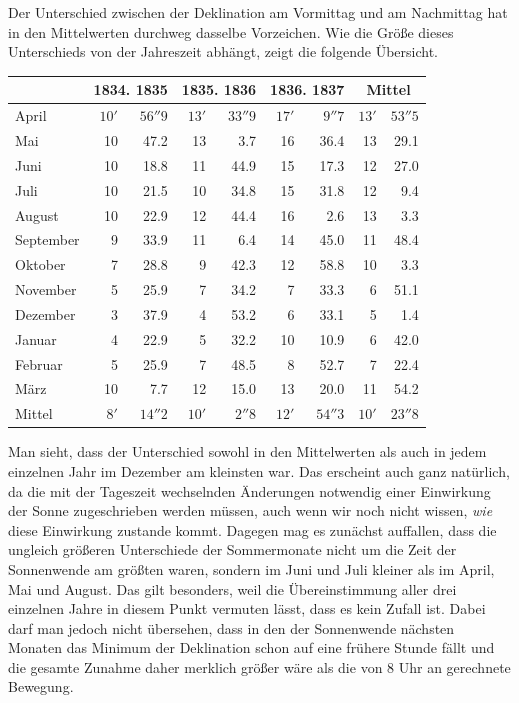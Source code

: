 Der Unterschied zwischen der Deklination am Vormittag und am Nachmittag hat in den Mittelwerten durchweg dasselbe Vorzeichen. Wie die Größe dieses Unterschieds von der Jahreszeit abhängt, zeigt die folgende Übersicht.
\begin{center}\small
\begin{tabular}{l||rr|rr|rr||rr}
&\multicolumn{2}{c|}{1834. 1835}&\multicolumn{2}{c|}{1835. 1836}&\multicolumn{2}{c||}{1836. 1837}&\multicolumn{2}{c}{Mittel}\\\hline\hline
April&$10'$&$56''9$&$13'$&$33''9$&$17'$&$9''7$&$13'$&$53''5$\\
Mai&10&47.2&13&3.7&16&36.4&13&29.1\\
Juni&10&18.8&11&44.9&15&17.3&12&27.0\\
Juli&10&21.5&10&34.8&15&31.8&12&9.4\\
August&10&22.9&12&44.4&16&2.6&13&3.3\\
September&9&33.9&11&6.4&14&45.0&11&48.4\\
Oktober&7&28.8&9&42.3&12&58.8&10&3.3\\
November&5&25.9&7&34.2&7&33.3&6&51.1\\
Dezember&3&37.9&4&53.2&6&33.1&5&1.4\\
Januar&4&22.9&5&32.2&10&10.9&6&42.0\\
Februar&5&25.9&7&48.5&8&52.7&7&22.4\\
März&10&7.7&12&15.0&13&20.0&11&54.2\\\hline\hline
Mittel&$8'$&$14''2$&$10'$&$2''8$&$12'$&$54''3$&$10'$&$23''8$
\end{tabular}
\end{center}
Man sieht, dass der Unterschied sowohl in den Mittelwerten als auch in jedem einzelnen Jahr im Dezember am kleinsten war. Das erscheint auch ganz natürlich, da die mit der Tageszeit wechselnden Änderungen notwendig einer Einwirkung der Sonne zugeschrieben werden müssen, auch wenn wir noch nicht wissen, \textit{wie} diese Einwirkung zustande kommt. Dagegen mag es zunächst auffallen, dass die ungleich größeren Unterschiede der Sommermonate nicht um die Zeit der
Sonnenwende am größten waren, sondern im Juni und Juli kleiner als im April, Mai und August. Das gilt besonders, weil die Übereinstimmung aller drei einzelnen Jahre in diesem Punkt vermuten lässt, dass es kein Zufall ist. Dabei darf man jedoch nicht übersehen, dass in den der Sonnenwende nächsten Monaten das Minimum der Deklination schon auf eine frühere Stunde fällt und die gesamte Zunahme daher merklich größer wäre als die von 8 Uhr an gerechnete Bewegung.

